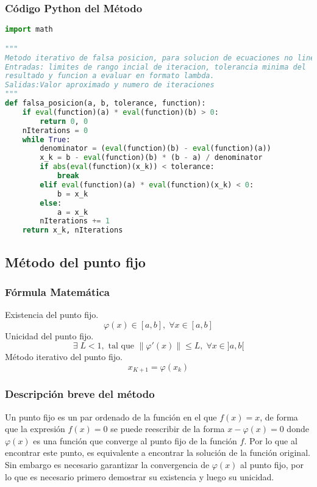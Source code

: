 \documentclass[12pt]{article}
\begin{document}
\subsubsection{Código Python del Método}

\begin{lstlisting}[language=Python, caption=Implementación del método de la posición falsa en Python]
import math

""" 
Metodo iterativo de falsa posicion, para solucion de ecuaciones no lineales.
Entradas: limites de rango incial de iteracion, tolerancia minima del 
resultado y funcion a evaluar en formato lambda.
Salidas:Valor aproximado y numero de iteraciones
"""
def falsa_posicion(a, b, tolerance, function):
    if eval(function)(a) * eval(function)(b) > 0:
        return 0, 0
    nIterations = 0
    while True:
        denominator = (eval(function)(b) - eval(function)(a))
        x_k = b - eval(function)(b) * (b - a) / denominator
        if abs(eval(function)(x_k)) < tolerance:
            break
        elif eval(function)(a) * eval(function)(x_k) < 0:
            b = x_k
        else:
            a = x_k
        nIterations += 1
    return x_k, nIterations
\end{lstlisting}

\subsection{Método del punto fijo}

\subsubsection{Fórmula Matemática}
Existencia del punto fijo.
\[\varphi(x) \in [a,b],\; \forall x\in [a,b]\]
Unicidad del punto fijo.
\[\exists\; L < 1, \text{ tal que } \|\varphi'(x)\|\leq L, \; \forall x \in ]a,b[\]
Método iterativo del punto fijo.
\[ x_{K+1}= \varphi(x_k)\]

\subsubsection{Descripción breve del método}
Un punto fijo es un par ordenado de la función en el que \( f(x) = x\), de forma que la expresión \(f(x) = 0\) se puede reescribir de la forma \(x- \varphi(x) = 0\) donde \(\varphi(x)\) es una función que converge al punto fijo de la función \(f\). Por lo que al encontrar este punto, es equivalente a encontrar la solución de la función original. Sin embargo es necesario garantizar la convergencia de \(\varphi(x)\) al punto fijo, por lo que es necesario primero demostrar su existencia y luego su unicidad.
\end{document}
